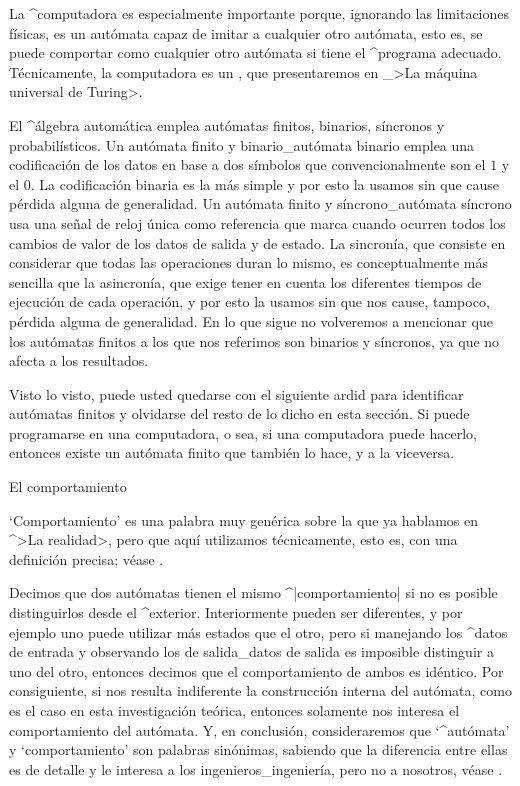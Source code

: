 La ^{computadora} es especialmente importante porque, ignorando las
limitaciones físicas, es un autómata capaz de imitar a cualquier otro
autómata, esto es, se puede comportar como cualquier otro autómata si
tiene el ^{programa} adecuado. Técnicamente, la computadora es un
{\UP}, que presentaremos en _>La máquina universal de Turing>.

El ^{álgebra automática} emplea autómatas finitos, binarios, síncronos y
probabilísticos. Un autómata finito y binario_{autómata binario} emplea
una codificación de los datos en base a dos símbolos que
convencionalmente son el $1$ y el $0$. La codificación binaria es la más
simple y por esto la usamos sin que cause pérdida alguna de generalidad.
Un autómata finito y síncrono_{autómata síncrono} usa una señal de reloj
única como referencia que marca cuando ocurren todos los cambios de
valor de los datos de salida y de estado. La sincronía, que consiste en
considerar que todas las operaciones duran lo mismo, es conceptualmente
más sencilla que la asincronía, que exige tener en cuenta los diferentes
tiempos de ejecución de cada operación, y por esto la usamos sin que nos
cause, tampoco, pérdida alguna de generalidad. En lo que sigue no
volveremos a mencionar que los autómatas finitos a los que nos referimos
son binarios y síncronos, ya que no afecta a los resultados.

Visto lo visto, puede usted quedarse con el siguiente ardid para
identificar autómatas finitos y olvidarse del resto de lo dicho en esta
sección. Si puede programarse en una computadora, o sea, si una
computadora puede hacerlo, entonces existe un autómata finito que
también lo hace, y a la viceversa.


\Section El comportamiento

`Comportamiento' es una palabra muy genérica sobre la que ya hablamos en
^>La realidad>, pero que aquí utilizamos técnicamente, esto es, con una
definición precisa; véase .

Decimos que dos autómatas tienen el mismo ^|comportamiento| si no es
posible distinguirlos desde el ^{exterior}. Interiormente pueden ser
diferentes, y por ejemplo uno puede utilizar más estados que el otro,
pero si manejando los ^{datos de entrada} y observando los de
salida_{datos de salida} es imposible distinguir a uno del otro,
entonces decimos que el comportamiento de ambos es idéntico. Por
consiguiente, si nos resulta indiferente la construcción interna del
autómata, como es el caso en esta investigación teórica, entonces
solamente nos interesa el comportamiento del autómata. Y, en conclusión,
consideraremos que `^{autómata}' y `comportamiento' son palabras
sinónimas, sabiendo que la diferencia entre ellas es de detalle y le
interesa a los ingenieros_{ingeniería}, pero no a nosotros, véase
.

